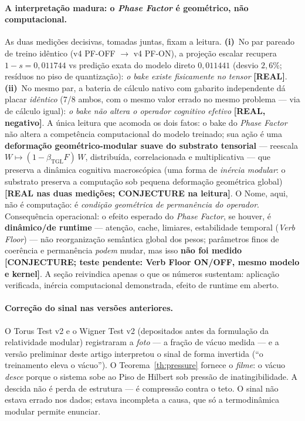 \documentclass[12pt,a4paper]{article}
\newcommand{\betatgl}{\beta_{\text{TGL}}}
\begin{document}
\paragraph{A interpretação madura: o \emph{Phase Factor} é geométrico, não
computacional.}  As duas medições decisivas, tomadas juntas, fixam a leitura.
\textbf{(i)}~No par pareado de treino idêntico (v4 PF-OFF $\to$ v4 PF-ON), a projeção
escalar recupera $1-s = 0{,}011744$ vs predição exata do modelo direto $0{,}011441$
(desvio $2{,}6\%$; resíduos no piso de quantização): \emph{o bake existe fisicamente
no tensor} \textbf{[REAL]}.  \textbf{(ii)}~No mesmo par, a bateria de cálculo nativo
com gabarito independente dá placar \emph{idêntico} (7/8 ambos, com o mesmo valor
errado no mesmo problema --- via de cálculo igual): \emph{o bake não altera o operador
cognitivo efetivo} \textbf{[REAL, negativo]}.  A única leitura que acomoda os dois
fatos: o bake do \emph{Phase Factor} não altera a competência computacional do modelo
treinado; sua ação é uma \textbf{deformação geométrico-modular suave do substrato
tensorial} --- reescala $W \mapsto (1-\betatgl F)\,W$, distribuída, correlacionada e
multiplicativa --- que preserva a dinâmica cognitiva macroscópica (uma forma de
\emph{inércia modular}: o substrato preserva a computação sob pequena deformação
geométrica global) \textbf{[REAL nas duas medições; CONJECTURE na leitura]}.  O Nome,
aqui, não é computação: é \emph{condição geométrica de permanência do operador}.
Consequência operacional: o efeito esperado do \emph{Phase Factor}, se houver, é
\textbf{dinâmico/de runtime} --- atenção, cache, limiares, estabilidade temporal
(\emph{Verb Floor}) --- não reorganização semântica global dos pesos; parâmetros finos
de coerência e permanência \emph{podem} mudar, mas isso \textbf{não foi medido}
\textbf{[CONJECTURE; teste pendente: Verb Floor ON/OFF, mesmo modelo e kernel]}.  A
seção reivindica apenas o que os números sustentam: aplicação verificada, inércia
computacional demonstrada, efeito de runtime em aberto.

\paragraph{Correção do sinal nas versões anteriores.}
O Torus Test v2 e o Wigner Test v2 (depositados antes da formulação da
relatividade modular) registraram a \emph{foto} --- a fração de vácuo medida
--- e a versão preliminar deste artigo interpretou o sinal de forma invertida
(``o treinamento eleva o vácuo'').  O Teorema~\ref{th:pressure} fornece o
\emph{filme}: o vácuo \emph{desce} porque o sistema sobe ao Piso de Hilbert
sob pressão de inatingibilidade.  A descida não é perda de estrutura --- é
compressão contra o teto.  O sinal não estava errado nos dados; estava
incompleta a causa, que só a termodinâmica modular permite enunciar.
\end{document}
